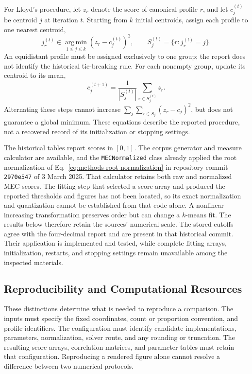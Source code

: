 \documentclass{article}
\theoremstyle{plain}
\theoremstyle{remark}
\begin{document}
For Lloyd's procedure, let $z_r$ denote the score of canonical profile $r$, and let $c_j^{(t)}$ be centroid $j$ at iteration $t$. Starting from $k$ initial centroids, assign each profile to one nearest centroid,
\begin{equation}\label{eq:methods-lloyd-assignment}
j_r^{(t)}\in\operatorname*{arg\,min}_{1\leq j\leq k}
       (z_r-c_j^{(t)})^2,
\qquad
S_j^{(t)}=\{r:j_r^{(t)}=j\}.
\end{equation}
An equidistant profile must be assigned exclusively to one group; the report does not identify the historical tie-breaking rule. For each nonempty group, update its centroid to its mean,
\begin{equation}\label{eq:methods-lloyd-update}
c_j^{(t+1)}=\frac{1}{|S_j^{(t)}|}\sum_{r\in S_j^{(t)}}z_r.
\end{equation}
Alternating these steps cannot increase $\sum_j\sum_{r\in S_j}(z_r-c_j)^2$, but does not guarantee a global minimum. These equations describe the reported procedure, not a recovered record of its initialization or stopping settings.

The historical tables report scores in $[0,1]$. The corpus generator and measure calculator are available, and the \texttt{MECNormalized} class already applied the root normalization of Eq.~\eqref{eq:methods-root-normalization} in repository commit \texttt{2970e547} of 3 March 2025. That calculator retains both raw and normalized MEC scores. The fitting step that selected a score array and produced the reported thresholds and figures has not been located, so its exact normalization and quantization cannot be established from that code alone. A nonlinear increasing transformation preserves order but can change a $k$-means fit. The results below therefore retain the sources' numerical scale. The stored cutoffs agree with the four-decimal report and are present in that historical commit. Their application is implemented and tested, while complete fitting arrays, initialization, restarts, and stopping settings remain unavailable among the inspected materials.

\subsection{Reproducibility and Computational Resources}\label{subsec:methods-reproducibility}

These distinctions determine what is needed to reproduce a comparison. The inputs must specify the fixed coordinates, count or proportion convention, and profile identifiers. The configuration must identify candidate implementations, parameters, normalization, solver route, and any rounding or truncation. The resulting score arrays, correlation matrices, and parameter tables must retain that configuration. Reproducing a rendered figure alone cannot resolve a difference between two numerical protocols.
\end{document}
